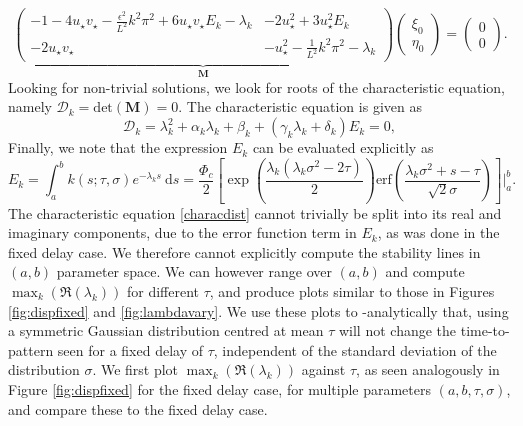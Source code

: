 \begin{equation}
\underbrace{\begin{pmatrix}-1-4u_\star v_\star-\frac{\epsilon^2}{L^2}k^2\pi^2+6u_\star v_\star E_k-\lambda_k&-2u_\star^2+3u_\star^2E_k\\-2u_\star v_\star&-u_\star^2-\frac{1}{L^2}k^2\pi^2-\lambda_k \end{pmatrix}}_{\textbf{M}}\begin{pmatrix}\xi_0\\\eta_0\end{pmatrix}=\begin{pmatrix}0\\0\end{pmatrix}.
\end{equation}
Looking for non-trivial solutions, we look for roots of the characteristic equation, namely $\mathcal{D}_k=\text{det}(\textbf{M})=0$. The characteristic equation is given as
\begin{equation}\label{characdist}
  \mathcal{D}_k=\lambda_k^2+\alpha_k\lambda_k+\beta_k+(\gamma_k\lambda_k+\delta_k)E_k=0,
\end{equation}
 Finally, we note that the expression $E_k$ can be evaluated explicitly as
\begin{equation}
E_k=\int_a^bk(s;\tau,\sigma)e^{-\lambda_k s}\ \text{d}s=\frac{\Phi_c}{2}\left[\exp\left(\frac{\lambda_k(\lambda_k\sigma^2-2\tau)}{2}\right) \text{erf} \left(\frac{\lambda_k\sigma^2+s-\tau}{\sqrt{2}\sigma}\right)\right]\Bigg|_a^b.
\end{equation}
The characteristic equation \eqref{characdist} cannot trivially be split into its real and imaginary components, due to the error function term in $E_k$, as was done in the fixed delay case. We therefore cannot explicitly compute the stability lines in $(a,b)$ parameter space. We can however range over $(a,b)$ and compute $\max_k(\Re(\lambda_k))$ for different $\tau$, and produce plots similar to those in Figures \ref{fig:dispfixed} and \ref{fig:lambdavary}. We use these plots to -analytically  that, using a symmetric Gaussian distribution centred at mean $\tau$ will not change the time-to-pattern seen for a fixed delay of $\tau$, independent of the standard deviation of the distribution $\sigma$. We first plot $\max_k(\Re(\lambda_k))$ against $\tau$, as seen analogously in Figure \ref{fig:dispfixed} for the fixed delay case, for multiple parameters $(a,b,\tau,\sigma)$, and compare these to the fixed delay case.

